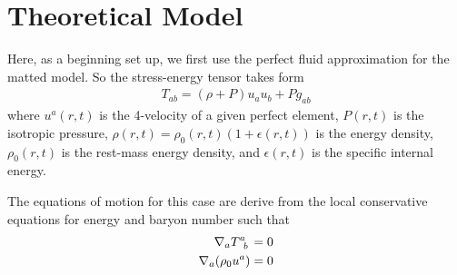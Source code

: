 \documentclass[prd]{revtex4}
\begin{document}

\section{Theoretical Model}

Here, as a beginning set up, we first use the perfect fluid approximation for the matted model. So the stress-energy tensor takes form
\begin{align}
\label{eqn:EMtPF}
T_{ab} = (\rho + P) u_a u_b +P g_{ab} 
\end{align}
where $u^a(r,t)$ is the 4-velocity of a given perfect element, $P(r,t)$ is the isotropic pressure, $\rho(r,t) = \rho_0(r,t) (1+\epsilon(r,t))$ is the energy density, $\rho_0 (r,t)$ is the rest-mass energy density, and $\epsilon(r,t)$ is the specific internal energy.

The equations of motion for this case are derive from the local conservative equations for energy and baryon number such that
\begin{align}
\nabla_a T\indices{^a_b} &= 0 \\
\nabla_a (\rho_0 u^a) &= 0 
\end{align}
\end{document}
